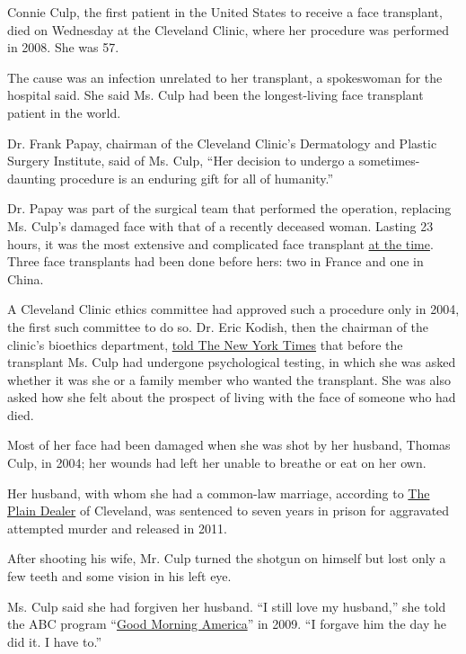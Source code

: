 Connie Culp, the first patient in the United States to receive a face
transplant, died on Wednesday at the Cleveland Clinic, where her
procedure was performed in 2008. She was 57.

The cause was an infection unrelated to her transplant, a spokeswoman
for the hospital said. She said Ms. Culp had been the longest-living
face transplant patient in the world.

Dr. Frank Papay, chairman of the Cleveland Clinic's Dermatology and
Plastic Surgery Institute, said of Ms. Culp, ``Her decision to undergo a
sometimes-daunting procedure is an enduring gift for all of humanity.''

Dr. Papay was part of the surgical team that performed the operation,
replacing Ms. Culp's damaged face with that of a recently deceased
woman. Lasting 23 hours, it was the most extensive and complicated face
transplant
\href{https://www.nytimes3xbfgragh.onion/2008/12/17/health/17face.html}{at
the time}. Three face transplants had been done before hers: two in
France and one in China.

A Cleveland Clinic ethics committee had approved such a procedure only
in 2004, the first such committee to do so. Dr. Eric Kodish, then the
chairman of the clinic's bioethics department,
\href{https://www.nytimes3xbfgragh.onion/2008/12/18/health/s18face.html}{told
The New York Times} that before the transplant Ms. Culp had undergone
psychological testing, in which she was asked whether it was she or a
family member who wanted the transplant. She was also asked how she felt
about the prospect of living with the face of someone who had died.

Most of her face had been damaged when she was shot by her husband,
Thomas Culp, in 2004; her wounds had left her unable to breathe or eat
on her own.

Her husband, with whom she had a common-law marriage, according to
\href{https://www.cleveland.com/healthfit/2010/11/woman_who_underwent_first_near.html}{The
Plain Dealer} of Cleveland, was sentenced to seven years in prison for
aggravated attempted murder and released in 2011.

After shooting his wife, Mr. Culp turned the shotgun on himself but lost
only a few teeth and some vision in his left eye.

Ms. Culp said she had forgiven her husband. ``I still love my husband,''
she told the ABC program
``\href{https://abcnews.go.com/Health/MindMoodNews/story?id=7535591}{Good
Morning America}'' in 2009. ``I forgave him the day he did it. I have
to.''

